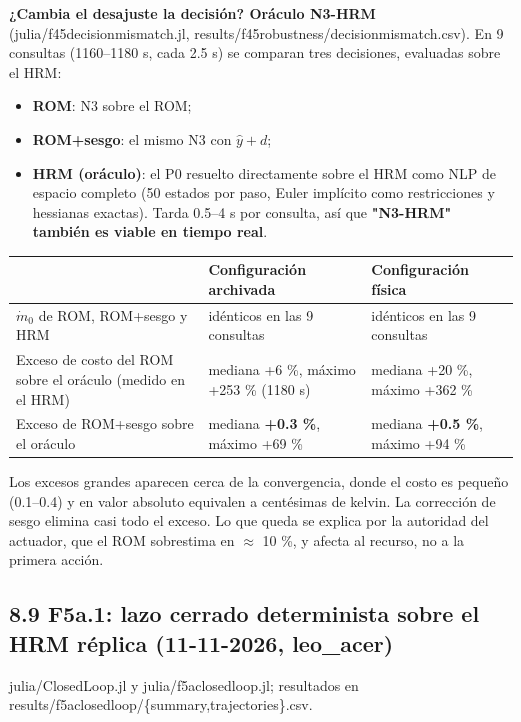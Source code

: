 \documentclass[11pt,a4paper]{article}
\newcommand{\codeus}{\textunderscore\allowbreak}
\newcommand{\code}[1]{{\small\ttfamily\let\_\codeus #1}}
\begin{document}
\textbf{¿Cambia el desajuste la decisión? Oráculo N3-HRM} (\code{julia/f45\_decision\_mismatch.jl}, \code{results/f45\_robustness/decision\_mismatch.csv}). En 9 consultas (1160–1180 s, cada 2.5 s) se comparan tres decisiones, evaluadas sobre el HRM:

\begin{itemize}
\item \textbf{ROM}: N3 sobre el ROM;
\item \textbf{ROM+sesgo}: el mismo N3 con $\hat y+d$;
\item \textbf{HRM (oráculo)}: el P0 resuelto directamente sobre el HRM como NLP de espacio completo (50 estados por paso, Euler implícito como restricciones y hessianas exactas). Tarda 0.5–4 s por consulta, así que \textbf{"N3-HRM" también es viable en tiempo real}.
\end{itemize}

{\small
\begin{xltabular}{\linewidth}{@{}YYY@{}}
\toprule
\textbf{} & \textbf{Configuración archivada} & \textbf{Configuración física} \\
\midrule
\endhead
$\dot m_0$ de ROM, ROM+sesgo y HRM & idénticos en las 9 consultas & idénticos en las 9 consultas \\
Exceso de costo del ROM sobre el oráculo (medido en el HRM) & mediana +6 \%, máximo +253 \% (1180 s) & mediana +20 \%, máximo +362 \% \\
Exceso de ROM+sesgo sobre el oráculo & mediana \textbf{+0.3 \%}, máximo +69 \% & mediana \textbf{+0.5 \%}, máximo +94 \% \\
\bottomrule
\end{xltabular}}

Los excesos grandes aparecen cerca de la convergencia, donde el costo es pequeño (0.1–0.4) y en valor absoluto equivalen a centésimas de kelvin. La corrección de sesgo elimina casi todo el exceso. Lo que queda se explica por la autoridad del actuador, que el ROM sobrestima en $\approx$ 10 \%, y afecta al recurso, no a la primera acción.

\subsection*{8.9 F5a.1: lazo cerrado determinista sobre el HRM réplica (11-11-2026, leo\_acer)}
\code{julia/ClosedLoop.jl} y \code{julia/f5a\_closed\_loop.jl}; resultados en \code{results/f5a\_closed\_loop/\{summary,trajectories\}.csv}.
\end{document}
